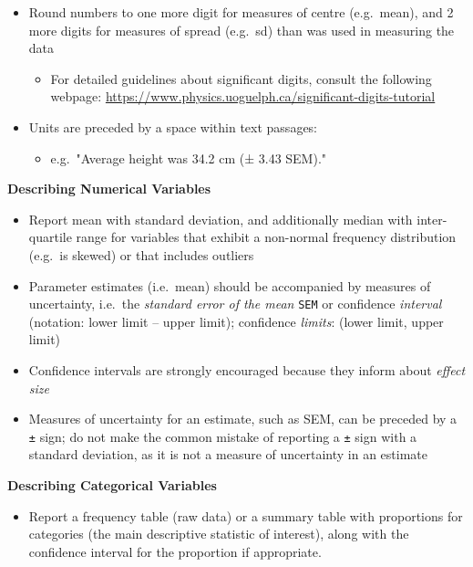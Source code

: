 \documentclass[
]{book}
\providecommand{\tightlist}{%
  \setlength{\itemsep}{0pt}\setlength{\parskip}{0pt}}
\begin{document}
\begin{itemize}
\tightlist
\item
  Round numbers to one more digit for measures of centre (e.g.~mean), and 2 more digits for measures of spread (e.g.~sd) than was used in measuring the data

  \begin{itemize}
  \tightlist
  \item
    For detailed guidelines about significant digits, consult the following webpage: \url{https://www.physics.uoguelph.ca/significant-digits-tutorial}
  \end{itemize}
\item
  Units are preceded by a space within text passages:

  \begin{itemize}
  \tightlist
  \item
    e.g.~"Average height was 34.2 cm (± 3.43 SEM)."
  \end{itemize}
\end{itemize}

\textbf{Describing Numerical Variables}

\begin{itemize}
\tightlist
\item
  Report mean with standard deviation, and additionally median with inter-quartile range for variables that exhibit a non-normal frequency distribution (e.g.~is skewed) or that includes outliers
\item
  Parameter estimates (i.e.~mean) should be accompanied by measures of uncertainty, i.e.~the \emph{standard error of the mean} \texttt{SEM} or confidence \emph{interval} (notation: lower limit -- upper limit); confidence \emph{limits}: (lower limit, upper limit)
\item
  Confidence intervals are strongly encouraged because they inform about \emph{effect size}
\item
  Measures of uncertainty for an estimate, such as SEM, can be preceded by a \texttt{±} sign; do not make the common mistake of reporting a \texttt{±} sign with a standard deviation, as it is not a measure of uncertainty in an estimate
\end{itemize}

\textbf{Describing Categorical Variables}

\begin{itemize}
\tightlist
\item
  Report a frequency table (raw data) or a summary table with proportions for categories (the main descriptive statistic of interest), along with the confidence interval for the proportion if appropriate.
\end{itemize}
\end{document}
